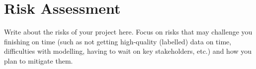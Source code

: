 \section{Risk Assessment}
\label{sec:risk_assessment}
Write about the risks of your project here. Focus on risks that may challenge you finishing on time (such as not getting high-quality (labelled) data on time, difficulties with modelling, having to wait on key stakeholders, etc.) and how you plan to mitigate them.